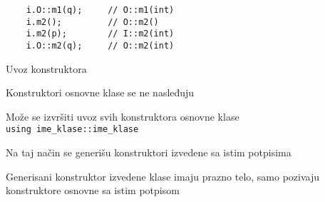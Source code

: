 \documentclass{article}
\newenvironment{xitemize}{%
    
    \itemize
    \larger
}{%
    \enditemize
}
\let\olditemize\itemize
\let\endolditemize\enditemize
\renewenvironment{itemize}{%
    \smaller
    \olditemize
}{%
    \endolditemize
}
\providecommand{\inlinecode}[1]{\texttt{#1}}
\begin{document}
\begin{xitemize}
\begin{itemize}
\begin{multicols}{2}
\begin{lstlisting}
    i.O::m1(q);     // O::m1(int)
    i.m2();         // O::m2()
    i.m2(p);        // I::m2(int)
    i.O::m2(q);     // O::m2(int)
\end{lstlisting}
\end{multicols}
\end{itemize}
\item Uvoz konstruktora
\begin{itemize}
    \item Konstruktori osnovne klase se ne nasleđuju
    \item Može se izvršiti uvoz svih konstruktora osnovne klase\\
    \inlinecode{using ime\_klase::ime\_klase}
    \item Na taj način se generišu konstruktori izvedene sa istim potpisima
    \item Generisani konstruktor izvedene klase imaju prazno telo, samo pozivaju konstruktore osnovne sa istim potpisom
    


\end{itemize}
\end{xitemize}
\end{document}
